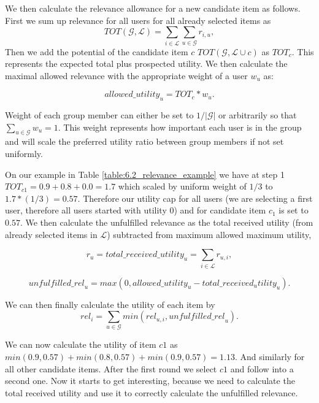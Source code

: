 We then calculate the relevance allowance for a new candidate item as follows. First we sum up relevance for all users for all already selected items as 
\begin{equation}
    TOT(\mathcal{G}, \mathcal{L}) = \sum_{i \in \mathcal{L}}\sum_{u\in \mathcal{G}} r_{i,u},
\end{equation}
Then we add the potential of the candidate item $c$ $TOT(\mathcal{G}, \mathcal{L} \cup c)$ as $TOT_c$. This represents the expected total plus prospected utility. We then calculate the maximal allowed relevance with the appropriate weight of a user $w_u$ as:

\begin{equation}
    allowed\_utility_u = TOT_c * w_u.
\end{equation}

Weight of each group member can either be set to $1/|\mathcal{G}|$ or arbitrarily so that $\sum_{u \in \mathcal{G}} w_u = 1$. This weight represents how important each user is in the group and will scale the preferred utility ratio between group members if not set uniformly.

On our example in Table \ref{table:6.2_relevance_example} we have at step 1 $TOT_{c1} = 0.9 + 0.8 + 0.0 = 1.7$ which scaled by uniform weight of $1/3$ to $ 1.7 * (1/3) = 0.57$. Therefore our utility cap for all users (we are selecting a first user, therefore all users started with utility 0) and for candidate item $c_1$ is set to $0.57$. We then calculate the unfulfilled relevance as the total received utility (from already selected items in $\mathcal{L}$) subtracted from maximum allowed maximum utility, 

\begin{equation}\label{eq:list_user_relevance}
    r_u = \mathit{total\_received\_utility}_u= \sum_{i \in \mathcal{L}} r_{u,i},
\end{equation}

\begin{equation}
    \mathit{unfulfilled\_rel}_u= max(0, allowed\_utility_u - \mathit{total\_received_utility}_u).
\end{equation}

We can then finally calculate the utility of each item by
\begin{equation}
    \mathit{rel}_i= \sum_{u \in \mathcal{G}} min(rel_{u,i}, \mathit{unfulfilled\_rel}_u).
\end{equation}

We can now calculate the utility of item $c1$ as $min(0.9, 0.57) + min(0.8, 0.57) + min(0.9, 0.57) = 1.13$. And similarly for all other candidate items. After the first round we select $c1$ and follow into a second one. Now it starts to get interesting, because we need to calculate the total received utility and use it to correctly calculate the unfulfilled relevance.

